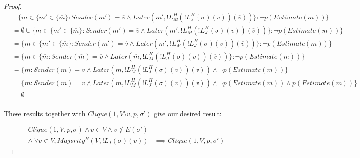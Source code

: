 \begin{proof}
\begin{align}
&~~~~\{m \in \{m' \in \{\overline{m}\} : Sender(m') = \overline{v} \land Later(m', !L^H_M(!L^H_J(\sigma)(v))(\overline{v}))\} : \neg p(Estimate(m)) \} \\
&= \emptyset \cup \{m \in \{m' \in \{\overline{m}\} : Sender(m') = \overline{v} \land Later(m', !L^H_M(!L^H_J(\sigma)(v))(\overline{v}))\} : \neg p(Estimate(m)) \} \\
&= \{m \in \{m' \in \{\overline{m}\} : Sender(m') = \overline{v} \land Later(m', !L^H_M(!L^H_J(\sigma)(v))(\overline{v}))\} : \neg p(Estimate(m)) \} \\
&= \{m \in \{\overline{m} : Sender(\overline{m}) = \overline{v} \land Later(\overline{m}, !L^H_M(!L^H_J(\sigma)(v))(\overline{v}))\} : \neg p(Estimate(m)) \} \\
&= \{\overline{m} : Sender(\overline{m}) = \overline{v} \land Later(\overline{m}, !L^H_M(!L^H_J(\sigma)(v))(\overline{v})) \land \neg p(Estimate(\overline{m})) \} \\
&= \{\overline{m} : Sender(\overline{m}) = \overline{v} \land Later(\overline{m}, !L^H_M(!L^H_J(\sigma)(v))(\overline{v})) \land \neg p(Estimate(\overline{m})) \land p(Estimate(\overline{m}))\} \\
&= \emptyset \\
\end{align}

These results together with $Clique(1, V \setminus {\overline{v}}, p, \sigma')$ give our desired result:

\begin{align}
Clique(1, V, p, \sigma) \land \overline{v} \in V \land \overline{v} \notin E(\sigma') &\\
\land ~\forall v \in V, Majority^H(V, !L_J(\sigma)(v)) &\implies Clique(1, V, p, \sigma')
\end{align}

\end{proof}






